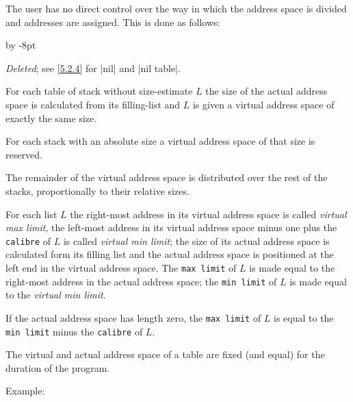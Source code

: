 \documentclass{article}
\newcommand\g[1]{{\sf #1}}
\renewenvironment{itemize}{\begin{list}{}{%
\advance\leftmargin by -8pt%
\setlength\itemsep{0ex plus 0.2ex}%
\setlength\partopsep{3pt}%
\setlength\topsep{2pt plus 2pt}%
\setlength\parsep{0pt plus 2pt}%
}}{\end{list}}
\begin{document}
The user has no direct control over the way in which the address space is
divided and addresses are assigned. This is done as follows:
\begin{itemize}
\item[a.] \emph{Deleted}; see \ref{5.2.4} for \pp|nil| and \pp|nil table|.
\item[b.] For each table of stack without \g{size-estimate} $L$ the size of
the actual address space is calculated from its \g{filling-list} and $L$ is
given a virtual address space of exactly the same size.
\item[c.] For each stack with an \g{absolute size} a virtual address space
of that size is reserved.
\item[d.] The remainder of the virtual address space is distributed over the
rest of the stacks, proportionally to their \g{relative size}s.
\end{itemize}
For each list $L$ the right-most address in its virtual address
space is called \emph{virtual max limit}, the left-most address in its
virtual address space minus one plus the {\tt calibre} of $L$ is called
\emph{virtual min limit}; the size of its actual address space is calculated
form its \g{filling list} and the actual address space is positioned at the
left end in the virtual address space. The {\tt max limit} of $L$ is made
equal to the right-most address in the actual address space; the
{\tt min limit} of $L$ is made equal to the \emph{virtual min limit}.

If the actual address space has length zero, the {\tt max limit} of $L$ is
equal to the {\tt min limit} minus the {\tt calibre} of $L$.

The virtual and actual address space of a table are fixed (and equal) for
the duration of the program.

\smallskip\noindent
Example:
\end{document}
